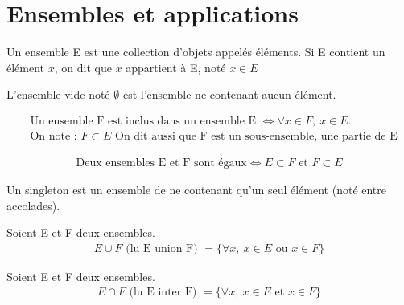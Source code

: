 \chapter{Ensembles et applications}
\begin{definition}
	Un ensemble E est une collection d'objets appelés éléments.
	Si E contient un élément $x$, on dit que $x$ appartient à E, noté $x \in E$ 
\end{definition}
\begin{definition}
	L'ensemble vide noté $\emptyset$ est l'ensemble ne contenant aucun élément.
\end{definition}
\begin{definition}[Inclusion]
	\begin{align*}
		&\text{Un ensemble F est inclus dans un ensemble E } \iff \forall x \in F,\ x \in E. \\
		&\text{On note : } F \subset E \text{ On dit aussi que F est un sous-ensemble, une partie de E}
	\end{align*}
\end{definition}
\begin{definition}
	\begin{align*}
		\text{Deux ensembles E et F sont égaux} \iff E \subset F \text{ et } F \subset E
	\end{align*} 
\end{definition}
\begin{definition}[Singleton]
	Un singleton est un ensemble de ne contenant qu'un seul élément (noté entre accolades).
\end{definition}
\begin{definition}
	Soient E et F deux ensembles.
	\begin{align*}
		E \cup F \text{ (lu E union F) } = \{\forall x,\ x \in E \text{ ou } x \in F \}
	\end{align*}
\end{definition}
\begin{definition}
	Soient E et F deux ensembles.
	\begin{align*}
		E \cap F \text{ (lu E inter F) } = \{\forall x,\ x \in E \text{ et } x \in F \}
	\end{align*}
\end{definition}
